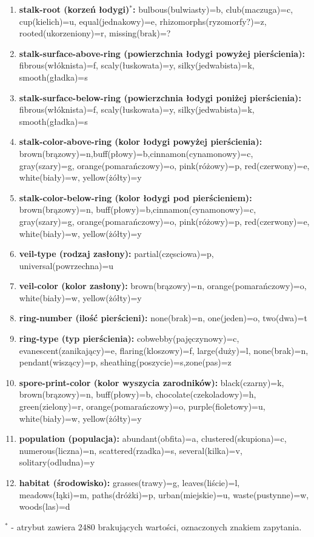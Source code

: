 \documentclass[10pt,a4paper]{article}
\begin{document}
\begin{flushleft}
\begin{enumerate}
		\item \textbf{stalk-root (korzeń łodygi)$^*$:} bulbous(bulwiasty)=b, club(maczuga)=c, cup(kielich)=u, equal(jednakowy)=e, rhizomorphs(ryzomorfy?)=z, rooted(ukorzeniony)=r, missing(brak)=?
		\item \textbf{stalk-surface-above-ring (powierzchnia łodygi powyżej pierścienia):} fibrous(włóknista)=f, scaly(łuskowata)=y, silky(jedwabista)=k, smooth(gładka)=s
		\item \textbf{stalk-surface-below-ring (powierzchnia łodygi poniżej pierścienia):} fibrous(włóknista)=f, scaly(łuskowata)=y, silky(jedwabista)=k, smooth(gładka)=s
		\item \textbf{stalk-color-above-ring (kolor łodygi powyżej pierścienia):} brown(brązowy)=n,buff(płowy)=b,cinnamon(cynamonowy)=c, gray(szary)=g, orange(pomarańczowy)=o, pink(różowy)=p, red(czerwony)=e, white(biały)=w, yellow(żółty)=y
		\item \textbf{stalk-color-below-ring (kolor łodygi pod pierścieniem):} brown(brązowy)=n, buff(płowy)=b,cinnamon(cynamonowy)=c, gray(szary)=g, orange(pomarańczowy)=o, pink(różowy)=p, red(czerwony)=e, white(biały)=w, yellow(żółty)=y
		\item \textbf{veil-type (rodzaj zasłony):} partial(częsciowa)=p, universal(powrzechna)=u
		\item \textbf{veil-color (kolor zasłony):} brown(brązowy)=n, orange(pomarańczowy)=o, white(biały)=w, yellow(żółty)=y
		\item \textbf{ring-number (ilość pierścieni):} none(brak)=n, one(jeden)=o, two(dwa)=t
		\item \textbf{ring-type (typ pierścienia):} cobwebby(pajęczynowy)=c, evanescent(zanikający)=e, flaring(kloszowy)=f, large(duży)=l, none(brak)=n, pendant(wiszący)=p, sheathing(poszycie)=s,zone(pas)=z
		\item \textbf{spore-print-color (kolor wyszycia zarodników):} black(czarny)=k, brown(brązowy)=n, buff(płowy)=b, chocolate(czekoladowy)=h, green(zielony)=r, orange(pomarańczowy)=o, purple(fioletowy)=u, white(biały)=w, yellow(żółty)=y
		\item \textbf{population (populacja):} abundant(obfita)=a, clustered(skupiona)=c, numerous(liczna)=n, scattered(rzadka)=s, several(kilka)=v, solitary(odludna)=y
		\item \textbf{habitat (środowisko):} grasses(trawy)=g, leaves(liście)=l, meadows(łąki)=m, paths(dróżki)=p, urban(miejskie)=u, waste(pustynne)=w, woods(las)=d 
	\end{enumerate}
\end{flushleft}
$^*$ - atrybut zawiera 2480 brakujących wartości, oznaczonych znakiem zapytania.
\vskip 0.2in
\end{document}
